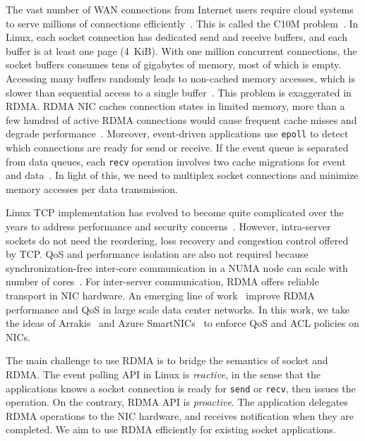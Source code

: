 The vast number of WAN connections from Internet users require cloud systems to serve millions of connections efficiently~\cite{nishtala2013scaling,lin2016scalable,belay2017ix}. This is called the C10M problem~\cite{graham2013c10m}. In Linux, each socket connection has dedicated send and receive buffers, and each buffer is at least one page (4~KiB). With one million concurrent connections, the socket buffers consumes tens of gigabytes of memory, most of which is empty. Accessing many buffers randomly leads to non-cached memory accesses, which is slower than sequential access to a single buffer~\cite{li2017kv}. This problem is exaggerated in RDMA. RDMA NIC caches connection states in limited memory, more than a few hundred of active RDMA connections would cause frequent cache misses and degrade performance~\cite{mprdma,kaminsky2016design}. Moreover, event-driven applications use \texttt{epoll} to detect which connections are ready for send or receive. If the event queue is separated from data queues, each \texttt{recv} operation involves two cache migrations for event and data~\cite{yasukata2016stackmap}. In light of this, we need to multiplex socket connections and minimize memory accesses per data transmission.


Linux TCP implementation has evolved to become quite complicated over the years to address performance and security concerns~\cite{yasukata2016stackmap}. However, intra-server sockets do not need the reordering, loss recovery and congestion control offered by TCP. QoS and performance isolation are also not required because synchronization-free inter-core communication in a NUMA node can scale with number of cores~\cite{intel-manual}. For inter-server communication, RDMA offers reliable transport in NIC hardware. An emerging line of work~\cite{zhu2015congestion,guo2016rdma,lu2017memory,mprdma} improve RDMA performance and QoS in large scale data center networks. In this work, we take the ideas of Arrakis~\cite{peter2016arrakis} and Azure SmartNICs~\cite{smartnic} to enforce QoS and ACL policies on NICs.

The main challenge to use RDMA is to bridge the semantics of socket and RDMA. The event polling API in Linux is \textit{reactive}, in the sense that the applications knows a socket connection is ready for \texttt{send} or \texttt{recv}, then issues the operation.
On the contrary, RDMA API is \textit{proactive}. The application delegates RDMA operations to the NIC hardware, and receives notification when they are completed.
We aim to use RDMA efficiently for existing socket applications.
